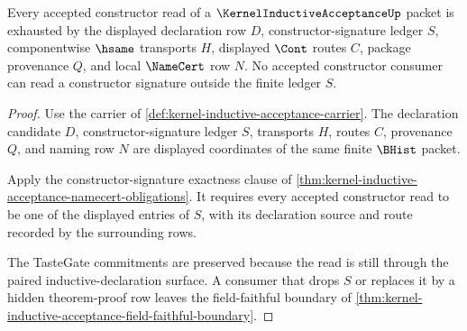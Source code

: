 \begin{theorem}
\label{thm:kernel-inductive-acceptance-constructor-ledger-exhaustion}
Every accepted constructor read of a $\KernelInductiveAcceptanceUp$ packet is exhausted by the displayed declaration row $D$, constructor-signature ledger $S$, componentwise $\hsame$ transports $H$, displayed $\Cont$ routes $C$, package provenance $Q$, and local $\NameCert$ row $N$. No accepted constructor consumer can read a constructor signature outside the finite ledger $S$.
\end{theorem}
\begin{proof}
Use the carrier of \autoref{def:kernel-inductive-acceptance-carrier}. The declaration candidate $D$, constructor-signature ledger $S$, transports $H$, routes $C$, provenance $Q$, and naming row $N$ are displayed coordinates of the same finite $\BHist$ packet.

Apply the constructor-signature exactness clause of \autoref{thm:kernel-inductive-acceptance-namecert-obligations}. It requires every accepted constructor read to be one of the displayed entries of $S$, with its declaration source and route recorded by the surrounding rows.

The TasteGate commitments are preserved because the read is still through the paired inductive-declaration surface. A consumer that drops $S$ or replaces it by a hidden theorem-proof row leaves the field-faithful boundary of \autoref{thm:kernel-inductive-acceptance-field-faithful-boundary}.
\end{proof}

